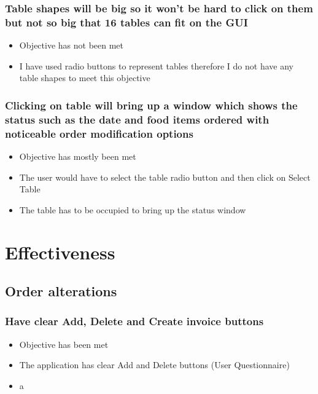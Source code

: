 \subsubsection{Table shapes will be big so it won't be hard to click on them but not so big that 16 tables can fit on the GUI}
\begin{itemize}
	\item Objective has not been met
	\item I have used radio buttons to represent tables therefore I do not have any table shapes to meet this objective

\end{itemize}

\subsubsection{Clicking on table will bring up a window which shows the status such as the date and food items ordered with noticeable order modification options}
\begin{itemize} 
	\item Objective has mostly been met
	\item The user would have to select the table radio button and then click on Select Table
	\item The table has to be occupied to bring up the status window

\end{itemize}

\section{Effectiveness}

\subsection{Order alterations}
\subsubsection{Have clear Add, Delete and Create invoice buttons}
\begin{itemize}
	\item Objective has been met
	\item The application has clear Add and Delete buttons (User Questionnaire)
	\item  a

\end{itemize}


